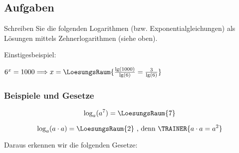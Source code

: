 \subsection*{Aufgaben}

Schreiben Sie die folgenden Logarithmen (bzw. Exponentialgleichungen)
als Lösungen mittels Zehnerlogarithmen (siehe oben).

Einstigesbeispiel:

 $6^x = 1000 \Longrightarrow x= \LoesungsRaum{\frac{\lg(1000)}{\lg(6)} = \frac{3}{\lg(6)}}$




\newpage



%



\subsubsection{Beispiele und Gesetze}
 
 \begin{beispiel}{}{}
   $$\log_a(a^7) = \LoesungsRaum{7}$$
\end{beispiel}


\begin{beispiel}{}{}
   $$\log_a(a\cdot{}a) = \LoesungsRaum{2} \text{ , denn } \TRAINER{a\cdot{}a = a^2}$$
\end{beispiel}


Daraus erkennen wir die folgenden Gesetze:

